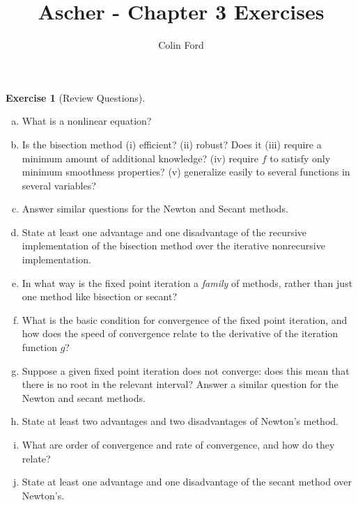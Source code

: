 \documentclass[12pt,a4]{article}
\author{Colin Ford}
\title{Ascher - Chapter 3 Exercises}
\date{}
\theoremstyle{definition}
\newtheorem{exercise}{Exercise}
\begin{document}
\maketitle

\begin{exercise}[Review Questions]
	\begin{enumerate}[(a)]
		\item What is a nonlinear equation?
		
		\item Is the bisection method (i) efficient? (ii) robust? Does it (iii) require a minimum amount of additional knowledge? (iv) require $f$ to satisfy only minimum smoothness properties? (v) generalize easily to several functions in several variables?
		
		\item Answer similar questions for the Newton and Secant methods.
		
		\item State at least one advantage and one disadvantage of the recursive implementation of the bisection method over the iterative nonrecursive implementation.
		
		\item In what way is the fixed point iteration a \emph{family} of methods, rather than just one method like bisection or secant?
		
		\item What is the basic condition for convergence of the fixed point iteration, and how does the speed of convergence relate to the derivative of the iteration function $g$?
		
		\item Suppose a given fixed point iteration does not converge: does this mean that there is no root in the relevant interval? Answer a similar question for the Newton and secant methods. 
		
		\item State at least two advantages and two disadvantages of Newton's method. 

		\item What are order of convergence and rate of convergence, and how do they relate?
		
		\item State at least one advantage and one disadvantage of the secant method over Newton's.
		

\end{enumerate}
\end{exercise}
\end{document}
